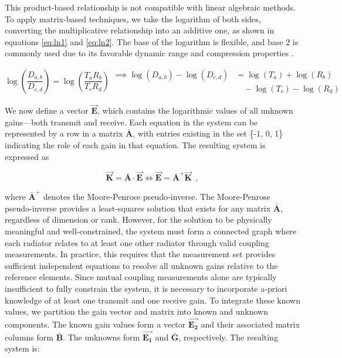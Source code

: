 \documentclass[journal]{IEEEtran}
\begin{document}
\noindent 
This product-based relationship is not compatible with linear algebraic methods. To apply matrix-based techniques, we take the logarithm of both sides, converting the multiplicative relationship into an additive one, as shown in equations \eqref{eq:ln1} and \eqref{eq:ln2}. The base of the logarithm is flexible, and base 2 is commonly used due to its favorable dynamic range and compression properties \cite{javier}.

\begin{subequations}
\begin{equation}\label{eq:ln1}
    \log\left(\frac{D_{a,b}}{D_{c,d}}\right) = \log\left(\frac{T_a R_b}{T_c R_d}\right)
\end{equation}
\begin{equation}\label{eq:ln2}
    \begin{aligned}
        \implies \log(D_{a,b}) - \log(D_{c,d}) &= \log(T_a) + \log(R_b) \\
        &\quad - \log(T_c) - \log(R_d)
    \end{aligned}
\end{equation}
\end{subequations}

We now define a vector \( \vec{\mathbf{E}} \), which contains the logarithmic values of all unknown gains—both transmit and receive. Each equation in the system can be represented by a row in a matrix \( \bar{\mathbf{A}} \), with entries existing in the set \{-1, 0, 1\} indicating the role of each gain in that equation. The resulting system is expressed as

\begin{equation}\label{eq:vectorized}
    \vec{\mathbf{K}} = \bar{\mathbf{A}} \cdot \vec{\mathbf{E}} \iff \vec{\mathbf{E}} = \bar{\mathbf{A}}^{+} \vec{\mathbf{K}} ~~,
\end{equation}

\noindent 
where \( \bar{\mathbf{A}}^{+} \) denotes the Moore-Penrose pseudo-inverse. The Moore-Penrose pseudo-inverse provides a least-squares solution that exists for any matrix $\bar{\mathbf{A}}$, regardless of dimension or rank. However, for the solution to be physically meaningful and well-constrained, the system must form a connected graph where each radiator relates to at least one other radiator through valid coupling measurements. In practice, this requires that the measurement set provides sufficient independent equations to resolve all unknown gains relative to the reference elements.
Since mutual coupling measurements alone are typically insufficient to fully constrain the system, it is necessary to incorporate a-priori knowledge of at least one transmit and one receive gain. To integrate these known values, we partition the gain vector and matrix into known and unknown components. The known gain values form a vector \( \vec{\mathbf{E_2}} \) and their associated matrix columns form \( \bar{\mathbf{B}} \). The unknowns form \( \vec{\mathbf{E_1}} \) and \( \bar{\mathbf{G}} \), respectively. The resulting system is:
\end{document}

